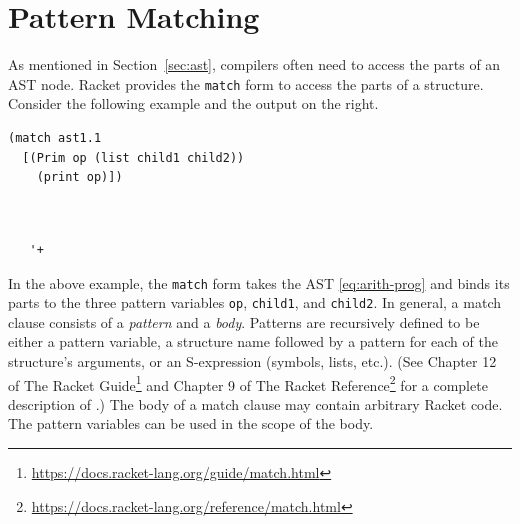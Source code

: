 \documentclass[11pt]{book}
\begin{document}
\section{Pattern Matching}
\label{sec:pattern-matching}

As mentioned in Section~\ref{sec:ast}, compilers often need to access
the parts of an AST node. Racket provides the \texttt{match} form to
access the parts of a structure. Consider the following example and
the output on the right.
\begin{center}
\begin{minipage}{0.5\textwidth}
\begin{lstlisting}
(match ast1.1
  [(Prim op (list child1 child2))
    (print op)])
\end{lstlisting}
\end{minipage}
\vrule
\begin{minipage}{0.25\textwidth}
\begin{lstlisting}


   '+
\end{lstlisting}
\end{minipage}
\end{center}
In the above example, the \texttt{match} form takes the AST
\eqref{eq:arith-prog} and binds its parts to the three pattern
variables \texttt{op}, \texttt{child1}, and \texttt{child2}. In
general, a match clause consists of a \emph{pattern} and a
\emph{body}. Patterns are recursively defined to be either a pattern
variable, a structure name followed by a pattern for each of the
structure's arguments, or an S-expression (symbols, lists, etc.).
(See Chapter 12 of The Racket
Guide\footnote{\url{https://docs.racket-lang.org/guide/match.html}}
and Chapter 9 of The Racket
Reference\footnote{\url{https://docs.racket-lang.org/reference/match.html}}
for a complete description of .)
%
The body of a match clause may contain arbitrary Racket code.  The
pattern variables can be used in the scope of the body.
\end{document}
